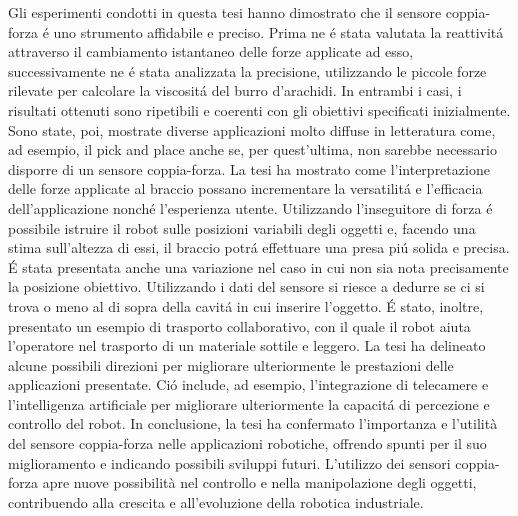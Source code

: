 Gli esperimenti condotti in questa tesi hanno dimostrato che il sensore coppia-forza \'{e} uno strumento affidabile e preciso. 
Prima ne \'{e} stata valutata la reattivit\'{a} attraverso il cambiamento istantaneo delle forze applicate ad esso, 
successivamente ne \'{e} stata analizzata la precisione, utilizzando le piccole forze rilevate per calcolare la viscosit\'{a} del 
burro d'arachidi. 
In entrambi i casi, i risultati ottenuti sono ripetibili e coerenti con gli obiettivi specificati inizialmente. 
Sono state, poi, mostrate diverse applicazioni molto diffuse in letteratura come, ad esempio, il pick and place anche se, per 
quest'ultima, non sarebbe necessario disporre di un sensore coppia-forza. La tesi ha mostrato come l'interpretazione 
delle forze applicate al braccio possano incrementare la versatilit\'{a} e l'efficacia dell'applicazione nonch\'{e} l'esperienza 
utente. Utilizzando l'inseguitore di forza \'{e} possibile istruire il robot sulle posizioni variabili degli oggetti e, 
facendo una stima sull'altezza di essi, il braccio potr\'{a} effettuare una presa pi\'{u} solida e precisa. 
\'{E} stata presentata anche una variazione nel caso in cui non sia nota precisamente la posizione obiettivo. Utilizzando i dati 
del sensore si riesce a dedurre se ci si trova o meno al di sopra della cavit\'{a} in cui inserire l'oggetto. 
\'{E} stato, inoltre, presentato un esempio di trasporto collaborativo, con il quale il robot aiuta l'operatore nel trasporto 
di un materiale sottile e leggero. 
La tesi ha delineato alcune possibili direzioni per migliorare ulteriormente le prestazioni delle applicazioni presentate. 
Ci\'{o} include, ad esempio, l'integrazione di telecamere e l'intelligenza artificiale per migliorare ulteriormente la capacit\'{a} 
di percezione e controllo del robot. 
In conclusione, la tesi ha confermato l'importanza e l'utilità del sensore coppia-forza nelle applicazioni robotiche, 
offrendo spunti per il suo miglioramento e indicando possibili sviluppi futuri. L'utilizzo dei sensori coppia-forza apre 
nuove possibilità nel controllo e nella manipolazione degli oggetti, contribuendo alla crescita e all'evoluzione 
della robotica industriale.